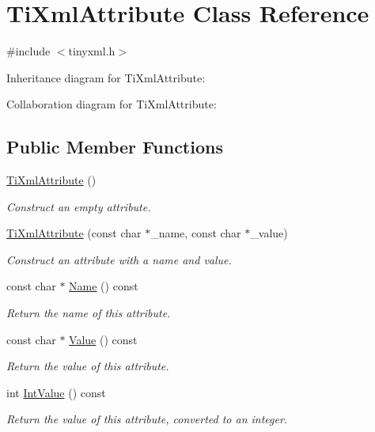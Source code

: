 \hypertarget{class_ti_xml_attribute}{\section{Ti\+Xml\+Attribute Class Reference}
\label{class_ti_xml_attribute}
}


{\ttfamily \#include $<$tinyxml.\+h$>$}



Inheritance diagram for Ti\+Xml\+Attribute\+:


Collaboration diagram for Ti\+Xml\+Attribute\+:
\subsection*{Public Member Functions}
\begin{DoxyCompactItemize}
\item 
\hyperlink{class_ti_xml_attribute_a9cfa3c8179873fd485d83003b114f8e1}{Ti\+Xml\+Attribute} ()
\begin{DoxyCompactList}\small\item\em Construct an empty attribute. \end{DoxyCompactList}\item 
\hyperlink{class_ti_xml_attribute_a759d0b76fb8fcf765ecab243bc14f05e}{Ti\+Xml\+Attribute} (const char $\ast$\+\_\+name, const char $\ast$\+\_\+value)
\begin{DoxyCompactList}\small\item\em Construct an attribute with a name and value. \end{DoxyCompactList}\item 
const char $\ast$ \hyperlink{class_ti_xml_attribute_a298a57287d305904ba6bd96ae6f78d3d}{Name} () const 
\begin{DoxyCompactList}\small\item\em Return the name of this attribute. \end{DoxyCompactList}\item 
const char $\ast$ \hyperlink{class_ti_xml_attribute_a0f874490eac8ca00ee0070765d0e97e3}{Value} () const 
\begin{DoxyCompactList}\small\item\em Return the value of this attribute. \end{DoxyCompactList}\item 
int \hyperlink{class_ti_xml_attribute_aa1a20ad59dc7e89a0ab265396360d50f}{Int\+Value} () const 
\begin{DoxyCompactList}\small\item\em Return the value of this attribute, converted to an integer. \end{DoxyCompactList}\item 

\end{DoxyCompactItemize}
